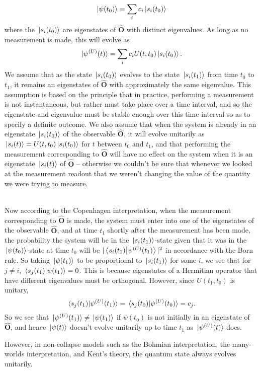 {  $$\ket*{\psi(t_0)}=\sum_i c_i\ket*{s_i(t_0)}$$
 where the $\ket*{s_i(t_0)}$ are eigenstates of $\hat{\bm{O}}$ with distinct eigenvalues. As long as no measurement is made, this will evolve as 
 $$\ket*{\psi^{(U)}(t)}=\sum_i c_iU(t,t_0)\ket*{s_i(t_0)}.$$  
 We assume that as the state $\ket*{s_i(t_0)}$ evolves to the state $\ket*{s_i(t_1)}$ from time $t_0$ to $t_1$, it remains an eigenstates of $\hat{\bm{O}}$ with approximately the same eigenvalue. This assumption is based on the principle that in practice, performing a measurement is not instantaneous, but rather must take place over a time interval, and so the eigenstate and eigenvalue must be stable enough over this time interval so as to specify a definite outcome. We also assume that when the system is already in an eigenstate $\ket*{s_i(t_0)}$ of the observable $\hat{\bm{O}}$, it will evolve unitarily as $\ket*{s_i(t)}=U(t,t_0)\ket*{s_i(t_0)}$ for $t$ between $t_0$ and $t_1$, and that performing the measurement corresponding to $\hat{\bm{O}}$ will have no effect on the system when it is an eigenstate  $\ket*{s_i(t)}$ of $\hat{\bm{O}}$ -- otherwise we couldn't be sure that whenever we looked at the measurement readout that we weren't changing the value of the quantity we were trying to measure. \strut \\[\baselineskip]
Now according to the Copenhagen interpretation, when the measurement corresponding to $\hat{\bm{O}}$ is made, the system must enter into one of the eigenstates of the observable $\hat{\bm{O}}$, and at time $t_1$ shortly after the measurement has been made, the probability the system will be in the $\ket*{s_i(t_1)}$-state given that it was in the $\ket*{\psi(t_0)}$-state at time $t_0$ will be $|\ip{s_i(t_1)}{\psi^{(U)}(t_1)}|^2$ in accordance with the Born rule. So taking $\ket*{\psi(t_1)}$ to be proportional to $\ket*{s_i(t_1)}$ for some $i$, we see that for $j\neq i$, $\ip*{s_j(t_1)}{\psi(t_1)}=0$. This is because eigenstates of a Hermitian operator that have different eigenvalues must be orthogonal. However, since $U(t_1,t_0)$ is unitary,
 $$\ip*{s_j(t_1)}{\psi^{(U)}(t_1)}=\ip*{s_j(t_0)}{\psi^{(U)}(t_0)}=c_j.$$
 So we see that $\ket*{\psi^{(U)}(t_1)}\neq\ket*{\psi(t_1)}$ if $\psi(t_0)$ is not initially in an eigenstate of $\hat{\bm{O}}$, and hence $\ket*{\psi(t)}$ doesn't evolve unitarily up to time $t_1$ as $\ket*{\psi^{(U)}(t)}$ does.} However, in non-collapse models  such as the Bohmian interpretation, the many-worlds interpretation, and Kent's theory, the quantum state always evolves unitarily. 
